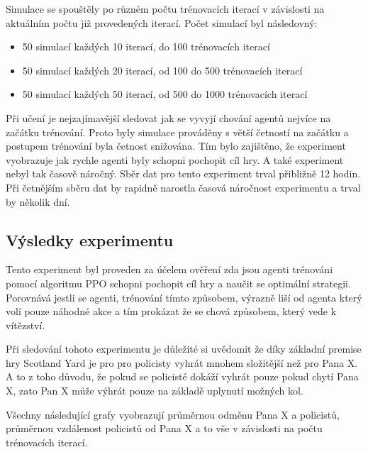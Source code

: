 Simulace se spouštěly po různém počtu trénovacích iterací v závislosti na aktuálním počtu již provedených iterací.
Počet simulací byl následovný:
\begin{itemize}
  \item 50 simulací každých 10 iterací, do 100 trénovacích iterací
  \item 50 simulací každých 20 iterací, od 100 do 500 trénovacích iterací
  \item 50 simulací každých 50 iterací, od 500 do 1000 trénovacích iterací
\end{itemize}

Při učení je nejzajímavější sledovat jak se vyvyjí chování agentů nejvíce na začátku trénování.
Proto byly simulace prováděny s větší četností na začátku a postupem trénování byla četnost snižována.
Tím bylo zajištěno, že experiment vyobrazuje jak rychle agenti byly schopni pochopit cíl hry.
A také experiment nebyl tak časově náročný.
Sběr dat pro tento experiment trval přibližně 12 hodin.
Při četnějším sběru dat by rapidně narostla časová náročnost experimentu a trval by několik dní.

\subsection{Výsledky experimentu}
\label{subsec:vysledky-experimentu-1}

Tento experiment byl proveden za účelem ověření zda jsou agenti trénováni pomocí algoritmu PPO schopni pochopit cíl hry a naučit se optimální strategii.
Porovnává jestli se agenti, trénování tímto způsobem, výrazně liší od agenta který volí pouze náhodné akce a tím prokázat že se chová způsobem, který vede k vítězství.

Při sledování tohoto experimentu je důležité si uvědomit že díky základní premise hry Scotland Yard je pro pro policisty vyhrát mnohem složitější než pro Pana X\@.
A to z toho důvodu, že pokud se policisté dokáží vyhrát pouze pokud chytí Pana X, zato Pan X může výhrát pouze na základě uplynutí možných kol.

Všechny následující grafy vyobrazují průměrnou odměnu Pana X a policistů, průměrnou vzdálenost policistů od Pana X a to vše v závislosti na počtu trénovacích iterací.

